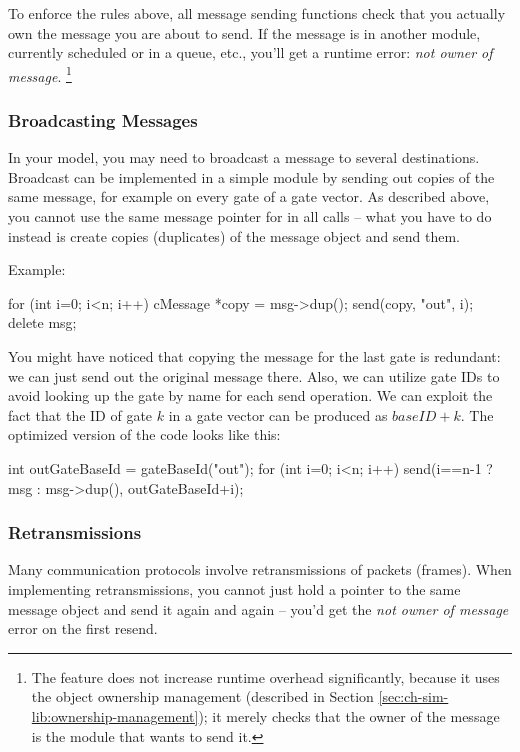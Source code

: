 To enforce the rules above, all message sending functions check that you
actually own the message you are about to send. If the message is in
another module, currently scheduled or in a queue, etc., you'll get a
runtime error: \textit{not owner of message}.
  \footnote{The feature does not increase runtime overhead significantly, because
  it uses the object ownership management (described in
  Section \ref{sec:ch-sim-lib:ownership-management});
  it merely checks that the owner of the message is the module that
  wants to send it.}


\subsubsection{Broadcasting Messages}

In your model, you may need to broadcast a message to several destinations.
Broadcast can be implemented in a simple module by sending out copies
of the same message, for example on every gate of a gate vector.
As described above, you cannot use the same message pointer for
in all  calls -- what you have to do instead is
create copies (duplicates) of the message object and send them.

Example:

\begin{cpp}
for (int i=0; i<n; i++)
{
    cMessage *copy = msg->dup();
    send(copy, "out", i);
}
delete msg;
\end{cpp}

You might have noticed that copying the message for the last gate is
redundant: we can just send out the original message there.
Also, we can utilize gate IDs to avoid looking up the gate by name
for each send operation. We can exploit the fact that the ID of gate
$k$ in a gate vector can be produced as ${baseID} + k$.
The optimized version of the code looks like this:

\begin{cpp}
int outGateBaseId = gateBaseId("out");
for (int i=0; i<n; i++)
    send(i==n-1 ? msg : msg->dup(), outGateBaseId+i);
\end{cpp}


\subsubsection{Retransmissions}

Many communication protocols involve retransmissions of packets (frames).
When implementing retransmissions, you cannot just hold a pointer
to the same message object and send it again and again -- you'd get
the \textit{not owner of message} error on the first resend.

